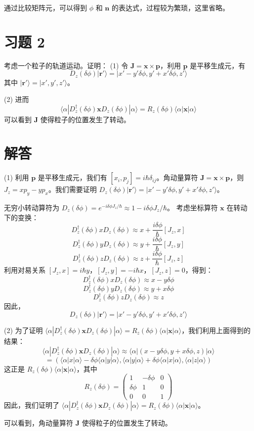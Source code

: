 \documentclass{article}
\begin{document}
通过比较矩阵元，可以得到 \(\phi\) 和 \(\mathbf{n}\) 的表达式，过程较为繁琐，这里省略。

\section*{习题 2}

考虑一个粒子的轨道运动。证明：
(1) 令 \(\mathbf{J} = \mathbf{x} \times \mathbf{p}\)，利用 \(\mathbf{p}\) 是平移生成元，有
\[
D_z(\delta\phi)|\mathbf{r}'\rangle = |x' - y'\delta\phi, y' + x'\delta\phi, z'\rangle
\]
其中 \(|\mathbf{r}'\rangle = |x', y', z'\rangle\)。

(2) 进而
\[
\langle\alpha|D_z^\dagger(\delta\phi)\mathbf{x}D_z(\delta\phi)|\alpha\rangle = R_z(\delta\phi)\langle\alpha|\mathbf{x}|\alpha\rangle
\]
可以看到 \(\mathbf{J}\) 使得粒子的位置发生了转动。

\section*{解答}

(1) 利用 \(\mathbf{p}\) 是平移生成元，我们有 \([x_i, p_j] = i\hbar\delta_{ij}\)。角动量算符 \(\mathbf{J} = \mathbf{x} \times \mathbf{p}\)，则 \(J_z = x p_y - y p_x\)。我们需要证明 \(D_z(\delta\phi)|\mathbf{r}'\rangle = |x' - y'\delta\phi, y' + x'\delta\phi, z'\rangle\)。

无穷小转动算符为 \(D_z(\delta\phi) = e^{-i\delta\phi J_z/\hbar} \approx 1 - i\delta\phi J_z/\hbar\)。
考虑坐标算符 \(\mathbf{x}\) 在转动下的变换：
\[
D_z^\dagger(\delta\phi) x D_z(\delta\phi) \approx x + \frac{i\delta\phi}{\hbar}[J_z, x]
\]
\[
D_z^\dagger(\delta\phi) y D_z(\delta\phi) \approx y + \frac{i\delta\phi}{\hbar}[J_z, y]
\]
\[
D_z^\dagger(\delta\phi) z D_z(\delta\phi) \approx z + \frac{i\delta\phi}{\hbar}[J_z, z]
\]
利用对易关系 \([J_z, x] = i\hbar y\)，\([J_z, y] = -i\hbar x\)，\([J_z, z] = 0\)，得到：
\[
D_z^\dagger(\delta\phi) x D_z(\delta\phi) \approx x - y\delta\phi
\]
\[
D_z^\dagger(\delta\phi) y D_z(\delta\phi) \approx y + x\delta\phi
\]
\[
D_z^\dagger(\delta\phi) z D_z(\delta\phi) \approx z
\]
因此，
\[
D_z(\delta\phi)|\mathbf{r}'\rangle = |x' - y'\delta\phi, y' + x'\delta\phi, z'\rangle
\]

(2) 为了证明 \(\langle\alpha|D_z^\dagger(\delta\phi)\mathbf{x}D_z(\delta\phi)|\alpha\rangle = R_z(\delta\phi)\langle\alpha|\mathbf{x}|\alpha\rangle\)，我们利用上面得到的结果：
\[
\langle\alpha|D_z^\dagger(\delta\phi)\mathbf{x}D_z(\delta\phi)|\alpha\rangle \approx \langle\alpha|(x - y\delta\phi, y + x\delta\phi, z)|\alpha\rangle
\]
\[
= (\langle\alpha|x|\alpha\rangle - \delta\phi\langle\alpha|y|\alpha\rangle, \langle\alpha|y|\alpha\rangle + \delta\phi\langle\alpha|x|\alpha\rangle, \langle\alpha|z|\alpha\rangle)
\]
这正是 \(R_z(\delta\phi)\langle\alpha|\mathbf{x}|\alpha\rangle\)，其中
\[
R_z(\delta\phi) = \begin{pmatrix} 1 & -\delta\phi & 0 \\ \delta\phi & 1 & 0 \\ 0 & 0 & 1 \end{pmatrix}
\]
因此，我们证明了 \(\langle\alpha|D_z^\dagger(\delta\phi)\mathbf{x}D_z(\delta\phi)|\alpha\rangle = R_z(\delta\phi)\langle\alpha|\mathbf{x}|\alpha\rangle\)。

可以看到，角动量算符 \(\mathbf{J}\) 使得粒子的位置发生了转动。
\end{document}

